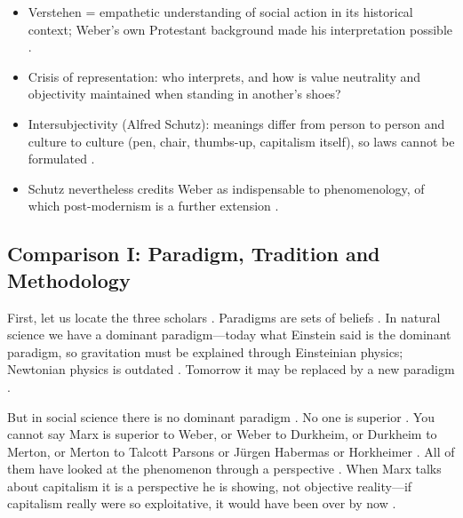 \begin{QuickRevision}
\begin{itemize}
    \item Verstehen = empathetic understanding of social action in its historical context; Weber's own Protestant background made his interpretation possible .
    \item Crisis of representation: who interprets, and how is value neutrality and objectivity maintained when standing in another's shoes? 
    \item Intersubjectivity (Alfred Schutz): meanings differ from person to person and culture to culture (pen, chair, thumbs-up, capitalism itself), so laws cannot be formulated .
    \item Schutz nevertheless credits Weber as indispensable to phenomenology, of which post-modernism is a further extension .
\end{itemize}
\end{QuickRevision}

\subsection{Comparison I: Paradigm, Tradition and Methodology}
First, let us locate the three scholars . Paradigms are sets of beliefs . In natural science we have a dominant paradigm---today what Einstein said is the dominant paradigm, so gravitation must be explained through Einsteinian physics; Newtonian physics is outdated . Tomorrow it may be replaced by a new paradigm .

\begin{CriticalPoint}
But in social science there is no dominant paradigm . No one is superior . You cannot say Marx is superior to Weber, or Weber to Durkheim, or Durkheim to Merton, or Merton to Talcott Parsons or J{\"u}rgen Habermas or Horkheimer .
All of them have looked at the phenomenon through a perspective . When Marx talks about capitalism it is a perspective he is showing, not objective reality---if capitalism really were so exploitative, it would have been over by now .
\end{CriticalPoint}

